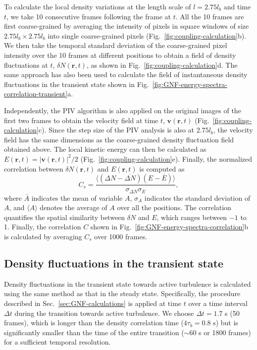 \documentclass[twocolumn,aps,prx,amsmath,amssymb,longbibliography,superscriptaddress]{revtex4-2}
\begin{document}
To calculate the local density variations at the length scale of $l = 2.75l_b$ and time $t$, we take 10 consecutive frames following the frame at $t$. All the 10 frames are first coarse-grained by averaging the intensity of pixels in square windows of size $2.75l_b \times 2.75l_b$ into single coarse-grained pixels (Fig.~\ref{fig:coupling-calculation}b). We then take the temporal standard deviation of the coarse-grained pixel intensity over the 10 frames at different positions to obtain a field of density fluctuations at $t$, $\delta N(\bm{r},t)$, as shown in Fig.~\ref{fig:coupling-calculation}d. The same approach has also been used to calculate the field of instantaneous density fluctuations in the transient state shown in Fig.~\ref{fig:GNF-energy-spectra-correlation-transient}a.

Independently, the PIV algorithm is also applied on the original images of the first two frames to obtain the velocity field at time $t$, $\bm{v}(\bm{r},t)$ (Fig.~\ref{fig:coupling-calculation}c). Since the step size of the PIV analysis is also at $2.75l_b$, the velocity field has the same dimensions as the coarse-grained density fluctuation field obtained above. The local kinetic energy can then be calculated as $E(\bm{r},t)=|\bm{v}(\bm{r},t)|^2/2$ (Fig.~\ref{fig:coupling-calculation}e). Finally, the normalized correlation between $\delta N(\bm{r},t)$ and $E(\bm{r},t)$ is computed as
\begin{equation}
C_s = \frac{\langle(\Delta N-\overline{\Delta N})(E-\overline{E})\rangle}{\sigma_{\Delta N}\sigma_{E}},
\end{equation}
where $\bar A$ indicates the mean of variable $A$, $\sigma_A$ indicates the standard deviation of $A$, and $\langle A \rangle$ denotes the average of $A$ over all the positions. The correlation quantifies the spatial similarity between $\delta N$ and $E$, which ranges between $-1$ to 1. Finally, the correlation $C$ shown in Fig.~\ref{fig:GNF-energy-spectra-correlation}b is
calculated by averaging $C_s$ over 1000 frames.


\subsection{Density fluctuations in the transient state} \label{appendix-IA-transient}

Density fluctuations in the transient state towards active turbulence is calculated using the same method as that in the steady state. Specifically, the procedure described in Sec.~\ref{sec:GNF-calculations} is applied at time $t$ over a time interval $\Delta t$ during the transition towards active turbulence. We choose $\Delta t = 1.7$ s (50 frames), which is longer than the density correlation time ($4\tau_b = 0.8$ s) but is significantly smaller than the time of the entire transition ($\sim 60$ s or 1800 frames) for a sufficient temporal resolution.



\end{document}
